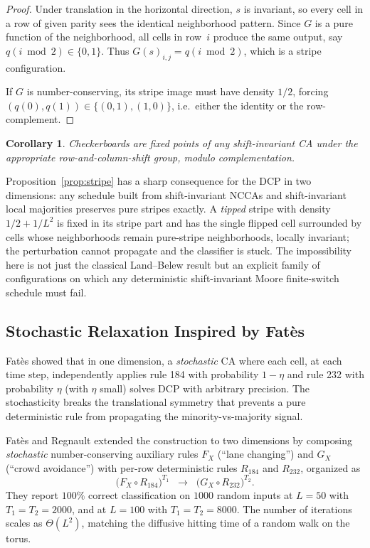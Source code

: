 \documentclass[11pt,a4paper]{article}
\newtheorem{corollary}{Corollary}
\begin{document}
\begin{proof}
Under translation in the horizontal direction, \(s\) is invariant, so every
cell in a row of given parity sees the identical neighborhood pattern.
Since \(G\) is a pure function of the neighborhood, all cells in row~\(i\)
produce the same output, say \(q(i \bmod 2) \in \{0,1\}\).  Thus
\(G(s)_{i,j} = q(i \bmod 2)\), which is a stripe configuration.

If \(G\) is number-conserving, its stripe image must have density \(1/2\),
forcing \((q(0),q(1))\in\{(0,1),(1,0)\}\), i.e.\ either the identity or the
row-complement.
\end{proof}

\begin{corollary}
Checkerboards are fixed points of any shift-invariant CA under the
appropriate row-and-column-shift group, modulo complementation.
\end{corollary}

Proposition~\ref{prop:stripe} has a sharp consequence for the DCP in two
dimensions: any schedule built from shift-invariant NCCAs and shift-invariant
local majorities preserves pure stripes exactly.  A \emph{tipped} stripe with
density \(1/2 + 1/L^2\) is fixed in its stripe part and has the single
flipped cell surrounded by cells whose neighborhoods remain pure-stripe
neighborhoods, locally invariant; the perturbation cannot propagate and the
classifier is stuck.  The impossibility here is not just the classical
Land--Belew result \cite{LandBelew1995} but an explicit family of
configurations on which any deterministic shift-invariant Moore
finite-switch schedule must fail.

\subsection{Stochastic Relaxation Inspired by Fat\`{e}s}

Fat\`{e}s \cite{FatesStacs2011,FatesRegnault2013} showed that in one
dimension, a \emph{stochastic} CA where each cell, at each time step,
independently applies rule 184 with probability \(1-\eta\) and rule 232 with
probability \(\eta\) (with \(\eta\) small) solves DCP with arbitrary
precision.  The stochasticity breaks the translational symmetry that
prevents a pure deterministic rule from propagating the minority-vs-majority
signal.

Fat\`{e}s and Regnault \cite{FatesRegnault2016} extended the construction to
two dimensions by composing \emph{stochastic} number-conserving auxiliary
rules \(F_X\) (``lane changing'') and \(G_X\) (``crowd avoidance'') with
per-row deterministic rules \(R_{184}\) and \(R_{232}\), organized as
\[
\bigl(F_X\circ R_{184}\bigr)^{T_1}
\;\;\longrightarrow\;\;
\bigl(G_X\circ R_{232}\bigr)^{T_2}.
\]
They report \(100\%\) correct classification on \(1000\) random inputs at
\(L=50\) with \(T_1=T_2=2000\), and at \(L=100\) with \(T_1=T_2=8000\).  The
number of iterations scales as \(\Theta(L^2)\), matching the diffusive
hitting time of a random walk on the torus.
\end{document}
